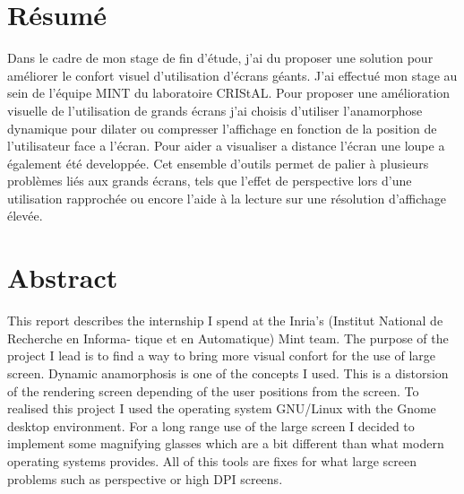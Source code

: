 \section*{Résumé}

Dans le cadre de mon stage de fin d’étude, j’ai du proposer une solution pour améliorer le confort visuel d'utilisation d'écrans géants. J'ai effectué mon stage au sein de l’équipe MINT du laboratoire CRIStAL.
Pour proposer une amélioration visuelle de l'utilisation de grands écrans j'ai choisis d'utiliser l'anamorphose dynamique pour dilater ou compresser l'affichage en fonction de la position de l'utilisateur face a l'écran. Pour aider a visualiser a distance l'écran une loupe a également été developpée.
Cet ensemble d'outils permet de palier à plusieurs problèmes liés aux grands écrans, tels que l'effet de perspective lors d'une utilisation rapprochée ou encore l'aide à la lecture sur une résolution d'affichage élevée.



\section*{Abstract}

This report describes the internship I spend at the Inria's (Institut National de Recherche en Informa-
tique et en Automatique) Mint team. The purpose of the project I lead is to find a way to bring more visual confort for the use of large screen. Dynamic anamorphosis is one of the concepts I used. This is a distorsion of the rendering screen depending of the user positions from the screen. To realised this project I used the operating system GNU/Linux with the Gnome desktop environment. For a long range use of the large screen I decided to implement some magnifying glasses which are a bit different than what modern operating systems provides. All of this tools are fixes for what large screen problems such as perspective or high DPI screens.

